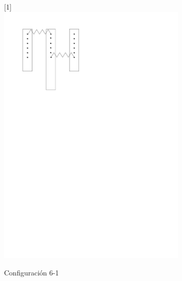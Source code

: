 \begin{figure}[htbp!]
\begin{subfigure}[b]{0.3\textwidth}
		\scalebox{-1}[1]{\includegraphics[width=\linewidth]{./Figures/16.pdf}}
		\caption{Configuración 6-1}
		\label{fig:conf-1-6}
	\end{subfigure}
	\hfill
	\begin{subfigure}[b]{0.3\textwidth}
		\centering

\end{subfigure}
\end{figure}
